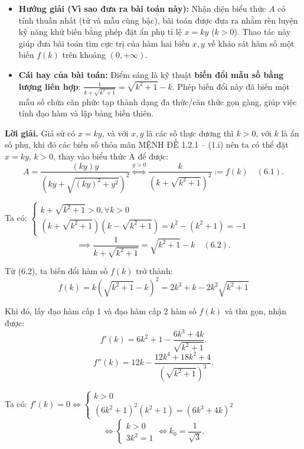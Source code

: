 \documentclass[12pt]{report}
\begin{document}
\begin{itemize}
    \item[\textbf{1.}] \textbf{Hướng giải (Vì sao đưa ra bài toán này):} 
    Nhận diện biểu thức $A$ có tính thuần nhất (tử và mẫu cùng bậc), bài toán được đưa ra nhằm rèn luyện kỹ năng khử biến bằng phép đặt ẩn phụ tỉ lệ $x = ky$ ($k > 0$). Thao tác này giúp đưa bài toán tìm cực trị của hàm hai biến $x, y$ về khảo sát hàm số một biến $f(k)$ trên khoảng $(0, +\infty)$.

    \item[\textbf{2.}] \textbf{Cái hay của bài toán:} 
    Điểm sáng là kỹ thuật \textbf{biến đổi mẫu số bằng lượng liên hợp}: $\frac{1}{k+\sqrt{k^2+1}} = \sqrt{k^2+1}-k$. Phép biến đổi này đã biến một mẫu số chứa căn phức tạp thành dạng đa thức/căn thức gọn gàng, giúp việc tính đạo hàm và lập bảng biến thiên.
\end{itemize}
\vspace{0.2cm}
\noindent \textbf{Lời giải.} Giả sử có $x = ky$, và với $x, y$ là các số thực dương thì $k > 0$, với $k$ là ẩn số phụ, khi đó các biến số thỏa mãn MỆNH ĐỀ 1.2.1 -- (1.i) nên ta có thể đặt $x = ky$, $k > 0$, thay vào biểu thức A để được:
\[
A = \dfrac{(ky)y}{\left(ky + \sqrt{(ky)^2 + y^2}\right)^2} \overset{y > 0}{\Leftrightarrow} \dfrac{k}{\left(k + \sqrt{k^2 + 1}\right)^2} := f(k) \quad (6.1).
\]

\vspace{0.2cm}
\noindent Ta có: $\begin{cases} k + \sqrt{k^2 + 1} > 0, \forall k > 0 \\ (k + \sqrt{k^2 + 1})(k - \sqrt{k^2 + 1}) = k^2 - (k^2 + 1) = -1 \end{cases}$
\[
\implies \dfrac{1}{k + \sqrt{k^2 + 1}} = \sqrt{k^2 + 1} - k \quad (6.2).
\]

\noindent Từ (6.2), ta biến đổi hàm số $f(k)$ trở thành:
\[
f(k) = k \left(\sqrt{k^2 + 1} - k\right)^2 = 2k^3 + k - 2k^2\sqrt{k^2 + 1}
\]

\noindent Khi đó, lấy đạo hàm cấp 1 và đạo hàm cấp 2 hàm số $f(k)$ và thu gọn, nhận được:
\[
f'(k) = 6k^2 + 1 - \dfrac{6k^3 + 4k}{\sqrt{k^2 + 1}}.
\]
\[
f''(k) = 12k - \dfrac{12k^4 + 18k^2 + 4}{\left(\sqrt{k^2+1}\right)^3}.
\]

\noindent Ta có: $f'(k) = 0 \Leftrightarrow \begin{cases} k > 0 \\ (6k^2 + 1)^2(k^2 + 1) = (6k^3 + 4k)^2 \end{cases}$
\[
\Leftrightarrow \begin{cases} k > 0 \\ 3k^2 = 1 \end{cases} \Leftrightarrow k_0 = \dfrac{1}{\sqrt{3}}.
\]
\end{document}
